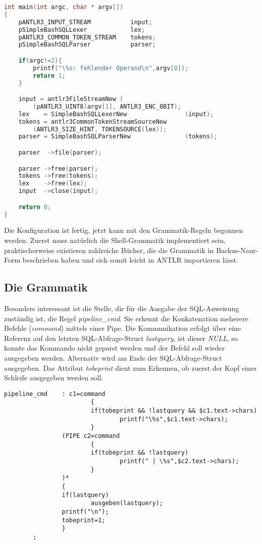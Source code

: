 \begin{lstlisting}[language=C]
int main(int argc, char * argv[])
{
	pANTLR3_INPUT_STREAM           input;
	pSimpleBashSQLLexer            lex;
	pANTLR3_COMMON_TOKEN_STREAM    tokens;
	pSimpleBashSQLParser           parser;

	if(argc!=2){
		printf("\%s: fehlender Operand\n",argv[0]);
		return 1;
	}

	input = antlr3FileStreamNew (
		(pANTLR3_UINT8)argv[1], ANTLR3_ENC_8BIT);
	lex    = SimpleBashSQLLexerNew                (input);
	tokens = antlr3CommonTokenStreamSourceNew
		(ANTLR3_SIZE_HINT, TOKENSOURCE(lex));
	parser = SimpleBashSQLParserNew               (tokens);

	parser  ->file(parser);

	parser ->free(parser);
	tokens ->free(tokens);
	lex    ->free(lex);
	input  ->close(input);

	return 0;
}
\end{lstlisting}

Die Konfiguration ist fertig, jetzt kann mit den Grammatik-Regeln begonnen werden. Zuerst muss natürlich die Shell-Grammatik implementiert sein, praktischerweise existieren zahlreiche Bücher, die die Grammatik in Backus-Naur-Form beschrieben haben und sich somit leicht in ANTLR importieren lässt. \cite{Shell-BNF}

\subsection{Die Grammatik}
Besonders interessant ist die Stelle, dir für die Ausgabe der SQL-Anweisung zuständig ist, die Regel \textit{pipeline\_cmd}. Sie erkennt die Konkatenation meherere Befehle (\textit{command}) mittels einer Pipe. Die Kommunikation erfolgt über eine Referenz auf den letzten SQL-Abfrage-Struct \textit{lastquery}, ist dieser \textit{NULL}, so konnte das Kommando nicht geparst werden und der Befehl soll wieder ausgegeben werden. Alternativ wird am Ende der SQL-Abfrage-Struct ausgegeben. Das Attribut \textit{tobeprint} dient zum Erkennen, ob zuerst der Kopf einer Schleife ausgegeben werden soll.

\begin{lstlisting}
pipeline_cmd    : c1=command
                        {
                        if(tobeprint && !lastquery && $c1.text->chars)
                                printf("\%s",$c1.text->chars);
                        }
                (PIPE c2=command
                        {
                        if(tobeprint && !lastquery)
                                printf(" | \%s",$c2.text->chars);
                        }
                )*
                {
                if(lastquery)
                        ausgeben(lastquery);
                printf("\n");
                tobeprint=1;
                }
        ;
\end{lstlisting}

